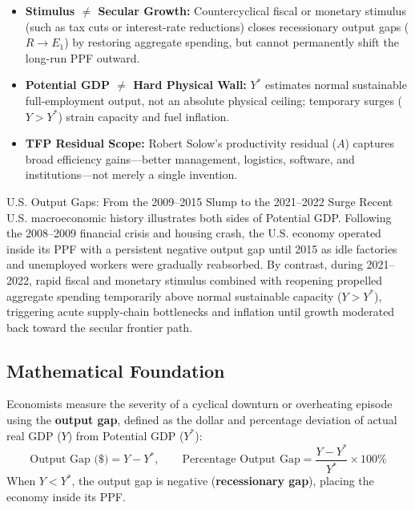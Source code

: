 \documentclass[11pt,letterpaper]{article}
\begin{document}
\begin{coreprinciple}
\begin{itemize}
  \item \textbf{Stimulus $\neq$ Secular Growth:} Countercyclical fiscal or monetary stimulus (such as tax cuts or interest-rate reductions) closes recessionary output gaps ($R \to E_1$) by restoring aggregate spending, but cannot permanently shift the long-run PPF outward.
  \item \textbf{Potential GDP $\neq$ Hard Physical Wall:} $Y^*$ estimates normal sustainable full-employment output, not an absolute physical ceiling; temporary surges ($Y > Y^*$) strain capacity and fuel inflation.
  \item \textbf{TFP Residual Scope:} Robert Solow's productivity residual ($A$) captures broad efficiency gains—better management, logistics, software, and institutions—not merely a single invention.
\end{itemize}
\end{coreprinciple}

\begin{examplecase}{U.S. Output Gaps: From the 2009–2015 Slump to the 2021–2022 Surge}
Recent U.S. macroeconomic history illustrates both sides of Potential GDP. Following the 2008–2009 financial crisis and housing crash, the U.S. economy operated inside its PPF with a persistent negative output gap until 2015 as idle factories and unemployed workers were gradually reabsorbed. By contrast, during 2021–2022, rapid fiscal and monetary stimulus combined with reopening propelled aggregate spending temporarily above normal sustainable capacity ($Y > Y^*$), triggering acute supply-chain bottlenecks and inflation until growth moderated back toward the secular frontier path.
\end{examplecase}

\subsection*{Mathematical Foundation}
Economists measure the severity of a cyclical downturn or overheating episode using the \textbf{output gap}, defined as the dollar and percentage deviation of actual real GDP ($Y$) from Potential GDP ($Y^*$):
\begin{equation}
\text{Output Gap (\$)} = Y - Y^*, \qquad \text{Percentage Output Gap} = \frac{Y - Y^*}{Y^*} \times 100\%
\end{equation}
When $Y < Y^*$, the output gap is negative (\textbf{recessionary gap}), placing the economy inside its PPF.
\end{document}
